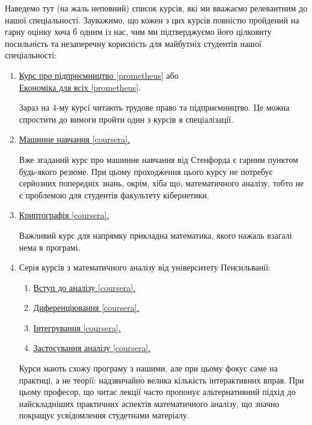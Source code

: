 \documentclass[14pt, a4paper]{extarticle}  %
\begin{document}
Наведемо тут (на жаль неповний) список курсів, які ми вважаємо релевантним до нашої спеціальності. Зауважимо, що кожен з цих курсів повністю пройдений на гарну оцінку хоча б одним із нас, чим ми підтверджуємо його цілковиту посильність та незаперечну корисність для майбутніх студентів нашої спеціальності:
\begin{enumerate}
    \item \href{https://prometheus.org.ua/entrepreneurship/}{Курс про підприємництво [prometheus]} або \\ \href{https://edx.prometheus.org.ua/courses/NaUKMA/103/2015_T1/about}{Економіка для всіх [prometheus]}.
    
    Зараз на 4-му курсі читають трудове право та підприємництво. Це можна спростити до вимоги пройти один з курсів в спеціалізації.
    
    \item \href{https://www.coursera.org/learn/machine-learning}{Машинне навчання [coursera].}
    
    Вже згаданий курс про машинне навчання від Стенфорда є гарним пунктом будь-якого резюме. При цьому проходження цього курсу не потребує серйозних попередніх знань, окрім, хіба що, математичного аналізу, тобто не є проблемою для студентів факультету кібернетики.
    
    \item \href{https://www.coursera.org/learn/crypto}{Криптографія [coursera].}
    
    Важливий курс для напрямку прикладна математика, якого нажаль взагалі нема в програмі.
    
    \item Серія курсів з математичного аналізу від університету Пенсильванії:
	\begin{enumerate}
		\item \href{https://www.coursera.org/learn/single-variable-calculus/home/welcome}{Вступ до аналізу [coursera].}
		\item \href{https://www.coursera.org/learn/differentiation-calculus/home/welcome}{Диференціювання [coursera].}
		\item \href{https://www.coursera.org/learn/integration-calculus/home/welcome}{Інтегрування [coursera].}
		\item \href{https://www.coursera.org/learn/applications-calculus/home/welcome}{Застосування аналізу [coursera].}
	\end{enumerate}
    
    Курси мають схожу програму з нашими, але при цьому фокус саме на практиці, а не теорії: надзвичайно велика кількість інтерактивних вправ. При цьому професор, що читає лекції часто пропонує альтернативний підхід до найскладніших практичних аспектів математичного аналізу, що значно покращує усвідомлення студетнами матеріалу.


\end{enumerate}
\end{document}

